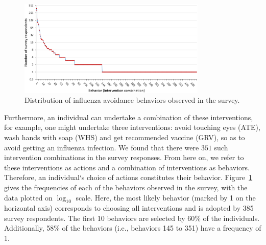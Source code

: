\documentclass[doublespace,draft]{VTthesis}
\begin{document}
    \begin{figure}[H]
    \centering
    \includegraphics[width=0.8\textwidth]{figures/uniquevectors.png}
    \caption{Distribution of influenza avoidance behaviors observed in the survey.}
    \label{fig:avoidancedist}
    \end{figure}
	Furthermore, an individual can undertake a combination of these interventions, for example, one might undertake three interventions: avoid touching eyes (ATE), wash hands with soap (WHS) and get recommended vaccine (GRV), so as to avoid getting an influenza infection. We found that there were $351$ such intervention combinations in the survey responses. From here on, we refer to these interventions as actions and a combination of interventions as behaviors. Therefore, an individual`s choice of actions constitutes their behavior. Figure~\ref{fig:avoidancedist} gives the frequencies of each of the behaviors observed in the survey, with the data plotted on $\log_{10}$ scale. Here, the most likely behavior (marked by 1 on the horizontal axis) corresponds to choosing all interventions and is adopted by 385 survey respondents. The first 10 behaviors are selected by 60\% of the individuals. Additionally, 58\% of the behaviors (i.e., behaviors 145 to 351) have a frequency of 1.
    
	
\end{document}
